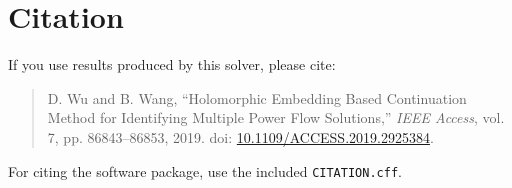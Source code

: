 \documentclass[11pt,a4paper]{article}
\newcommand{\code}[1]{\texttt{#1}}
\begin{document}
\section{Citation}

If you use results produced by this solver, please cite:

\begin{quote}
D. Wu and B. Wang, ``Holomorphic Embedding Based Continuation Method for Identifying
Multiple Power Flow Solutions,'' \emph{IEEE Access}, vol. 7, pp. 86843--86853, 2019.
doi: \href{https://doi.org/10.1109/ACCESS.2019.2925384}{10.1109/ACCESS.2019.2925384}.
\end{quote}

For citing the software package, use the included \code{CITATION.cff}.
\end{document}
